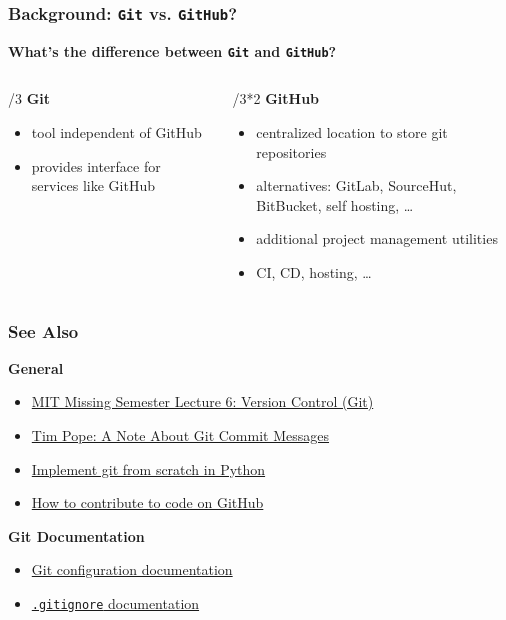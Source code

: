 \documentclass{beamer} \usetheme{Madrid}
\begin{document}
\begin{frame} \frametitle{Background: \texttt{Git} vs. \texttt{GitHub}?}
	\centering \textbf{What's the difference between \texttt{Git} and \texttt{GitHub}?}
	\vfill
	\begin{columns}[t]
		\begin{column}{{\textwidth}/3}
			\centering \textbf{Git}
			\begin{itemize}
				\item tool independent of GitHub
				\item provides interface for services like GitHub
			\end{itemize}
		\end{column}
		\begin{column}{{\textwidth}/3*2}
			\centering \textbf{GitHub}
			\begin{itemize}
				\item centralized location to store git repositories
				\item alternatives: GitLab, SourceHut, BitBucket, self hosting, \ldots
				\item additional project management utilities
				\item CI, CD, hosting, \ldots
			\end{itemize}
		\end{column}
	\end{columns}
\end{frame}

\begin{frame}
	\frametitle{See Also}
	\centering \textbf{General}
	\begin{itemize}
		\setlength\itemsep{1em}
		\item \href{https://missing.csail.mit.edu/2020/version-control/}{MIT Missing Semester Lecture 6: Version Control (Git)}
		\item \href{https://tbaggery.com/2008/04/19/a-note-about-git-commit-messages.html}{Tim Pope: A Note About Git Commit Messages}
		\item \href{https://wyag.thb.lt/}{Implement git from scratch in Python}
		\item
		      \href{https://docs.github.com/en/free-pro-team@latest/github/collaborating-with-issues-and-pull-requests/about-pull-requests}{How to contribute to code on GitHub}
	\end{itemize}
	\vfill
	\centering \textbf{Git Documentation}
	\begin{itemize}
		\item \href{https://git-scm.com/docs/git-config}{Git configuration documentation}
		\item \href{https://git-scm.com/docs/gitignore}{\texttt{.gitignore} documentation}
	\end{itemize}
\end{frame}
\end{document}
